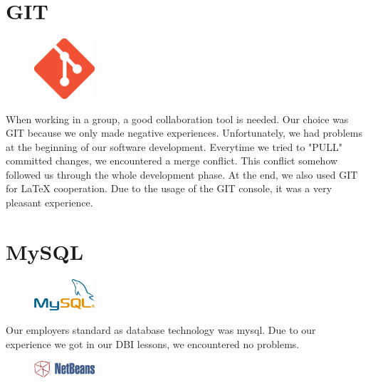 \section{GIT}
\begin{figure}
  \begin{center}
    \includegraphics[width=0.2\textwidth] {bilder/git}
  \end{center}
\end{figure}
When working in a group, a good collaboration tool is needed. Our choice was GIT because we only made negative experiences.\newline
Unfortunately, we had problems at the beginning of our software development. Everytime we tried to "PULL" committed changes, we encountered a merge conflict. This conflict somehow followed us through the whole development phase.\newline
At the end, we also used GIT for LaTeX cooperation. Due to the usage of the GIT console, it was a very pleasant experience.
\section{MySQL}
\begin{figure}
  \begin{center}
    \includegraphics[width=0.2\textwidth] {bilder/MySQL}
  \end{center}
\end{figure}
Our employers standard as database technology was \gls{mysql}. Due to our experience we got in our DBI lessons, we encountered no problems.
\begin{figure}
  \begin{center}
    \includegraphics[width=0.2\textwidth] {bilder/NetBeans}
  \end{center}
\end{figure}
